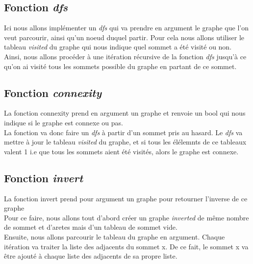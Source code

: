 \documentclass[a4paper]{article}
\begin{document}
\subsection{Fonction \emph{dfs}}
Ici nous allons implémenter un \emph{dfs} qui va prendre en argument le graphe que l'on veut parcourir, ainsi qu'un noeud
duquel partir. Pour cela nous allons utiliser le tableau \emph{visited} du graphe qui nous indique quel sommet a été visité
ou non.\\
Ainsi, nous allons procéder à une itération récursive de la fonction \emph{dfs} jusqu'à ce qu'on ai visité tous les sommets
possible du graphe en partant de ce sommet.\\

\subsection{Fonction \emph{connexity}}
La fonction connexity prend en argument un graphe et renvoie un bool qui nous indique si le graphe est connexe ou pas.\\
La fonction va donc faire un \emph{dfs} à partir d'un sommet pris au hasard. Le \emph{dfs} va mettre à jour le tableau \emph{visited}
du graphe, et si tous les élélemnts de ce tableaux valent 1 i.e que tous les sommets aient été visités, alors le graphe est connexe.\\

\subsection{Fonction \emph{invert}}
La fonction invert prend pour argument un graphe pour retourner l'inverse de ce graphe\\
Pour ce faire, nous allons tout d'abord créer un graphe \emph{inverted} de même nombre de sommet et d'aretes mais d'un tableau de sommet vide.\\
Ensuite, nous allons parcourir le tableau du graphe en argument. Chaque itération va traiter la liste des adjacents du sommet x. 
De ce fait, le sommet x va être ajouté à chaque liste des adjacents de sa propre liste.\\
\end{document}
